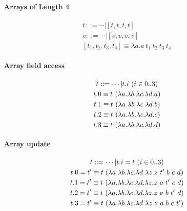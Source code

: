 \documentclass{article}
\newcommand{\lam}[2]{\ensuremath{\lambda#1.#2}}
\begin{document}
\paragraph{Arrays of Length 4}
\begin{gather*}
    t ::= \cdots | [t,t,t,t] \\
    v ::= \cdots | [v,v,v,v] \\
    [t_1,t_2,t_3,t_4] \equiv \lam{a}{a\ t_1\ t_2\ t_3\ t_4}
\end{gather*}

\paragraph{Array field access}
\begin{gather*}
    t ::= \cdots | t.i\ (i\in0..3) \\
    t.0 \equiv t\ (\lam{a}\lam{b}\lam{c}\lam{d}{a}) \\
    t.1 \equiv t\ (\lam{a}\lam{b}\lam{c}\lam{d}{b}) \\
    t.2 \equiv t\ (\lam{a}\lam{b}\lam{c}\lam{d}{c}) \\
    t.3 \equiv t\ (\lam{a}\lam{b}\lam{c}\lam{d}{d}) \\
\end{gather*}

\paragraph{Array update}
\begin{gather*}
    t ::= \cdots | t.i=t\ (i\in0..3) \\
    t.0=t' \equiv t\ (\lam{a}\lam{b}\lam{c}\lam{d}{\lam{z}{z\ t'\ b\ c\ d}}) \\
    t.1=t' \equiv t\ (\lam{a}\lam{b}\lam{c}\lam{d}{\lam{z}{z\ a\ t'\ c\ d}}) \\
    t.2=t' \equiv t\ (\lam{a}\lam{b}\lam{c}\lam{d}{\lam{z}{z\ a\ b\ t'\ d}}) \\
    t.3=t' \equiv t\ (\lam{a}\lam{b}\lam{c}\lam{d}{\lam{z}{z\ a\ b\ c\ t'}})
\end{gather*}
\end{document}
